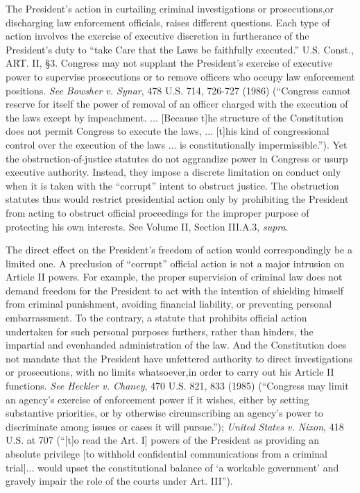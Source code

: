 The President’s action in curtailing criminal investigations or prosecutions,or discharging law enforcement officials, raises different questions.
Each type of action involves the exercise of executive discretion in furtherance of the President’s duty to “take Care that the Laws be faithfully executed.” U.S. Const., ART. II, \S 3.
Congress may not supplant the President’s exercise of executive power to supervise prosecutions or to remove officers who occupy law enforcement positions.
\textit{See Bowsher v. Synar}, 478 U.S. 714, 726-727 (1986) (“Congress cannot reserve for itself the power of removal of an officer charged with the execution of the laws except by impeachment. ... [Because t]he structure of the Constitution does not permit Congress to execute the laws, ... [t]his kind of congressional control over the execution of the laws ... is constitutionally impermissible.”).
Yet the obstruction-of-justice statutes do not aggrandize power in Congress or usurp executive authority.
Instead, they impose a discrete limitation on conduct only when it is taken with the “corrupt” intent to obstruct justice.
The obstruction statutes thus would restrict presidential action only by prohibiting the President from acting to obstruct official proceedings for the improper purpose of protecting his own interests.
See Volume II, Section III.A.3, \textit{supra}.

The direct effect on the President’s freedom of action would correspondingly be a limited one.
A preclusion of “corrupt” official action is not a major intrusion on Article II powers.
For example, the proper supervision of criminal law does not demand freedom for the President to act with the intention of shielding himself from criminal punishment, avoiding financial liability, or preventing personal embarrassment.
To the contrary, a statute that prohibits official action undertaken for such personal purposes furthers, rather than hinders, the impartial and evenhanded administration of the law.
And the Constitution does not mandate that the President have unfettered authority to direct investigations or prosecutions, with no limits whatsoever,in order to carry out his Article II functions.
\textit{See Heckler v. Chaney}, 470 U.S. 821, 833 (1985) (“Congress may limit an agency’s exercise of enforcement power if it wishes, either by setting substantive priorities, or by otherwise circumscribing an agency’s power to discriminate among issues or cases it will pursue.”);
\textit{United States v. Nixon}, 418 U.S. at 707 (“[t]o read the Art. I] powers of the President as providing an absolute privilege [to withhold confidential communications from a criminal trial]... would upset the constitutional balance of ‘a workable government’ and gravely impair the role of the courts under Art. III”).

